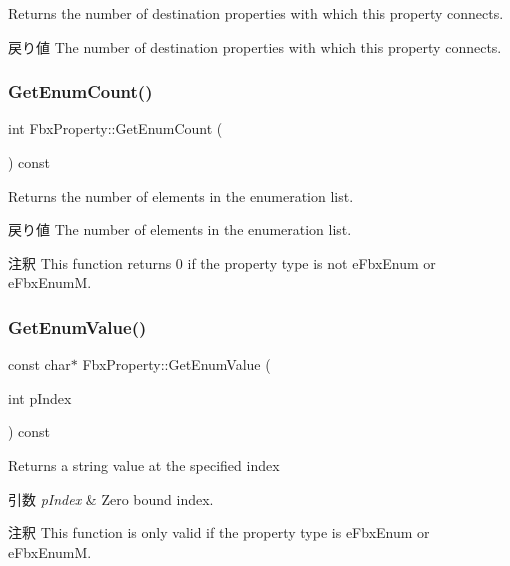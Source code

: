 Returns the number of destination properties with which this property connects. \begin{DoxyReturn}{戻り値}
The number of destination properties with which this property connects. 
\end{DoxyReturn}
\mbox{\label{class_fbx_property_ac06caf332b2d662a8ad09cff1f397820}} 
\subsubsection{\texorpdfstring{Get\+Enum\+Count()}{GetEnumCount()}}
{\footnotesize\ttfamily int Fbx\+Property\+::\+Get\+Enum\+Count (\begin{DoxyParamCaption}{ }\end{DoxyParamCaption}) const}

Returns the number of elements in the enumeration list. \begin{DoxyReturn}{戻り値}
The number of elements in the enumeration list. 
\end{DoxyReturn}
\begin{DoxyRemark}{注釈}
This function returns 0 if the property type is not e\+Fbx\+Enum or e\+Fbx\+EnumM. 
\end{DoxyRemark}
\mbox{\label{class_fbx_property_ab378e2225ba43c225625f137e48808d5}} 
\subsubsection{\texorpdfstring{Get\+Enum\+Value()}{GetEnumValue()}}
{\footnotesize\ttfamily const char$\ast$ Fbx\+Property\+::\+Get\+Enum\+Value (\begin{DoxyParamCaption}\item[{int}]{p\+Index }\end{DoxyParamCaption}) const}

Returns a string value at the specified index 
\begin{DoxyParams}{引数}
{\em p\+Index} & Zero bound index. \\
\hline
\end{DoxyParams}
\begin{DoxyRemark}{注釈}
This function is only valid if the property type is e\+Fbx\+Enum or e\+Fbx\+EnumM. 
\end{DoxyRemark}
\mbox{\label{class_fbx_property_aaa3f53accde176da9528ec831fc95ec8}} 
